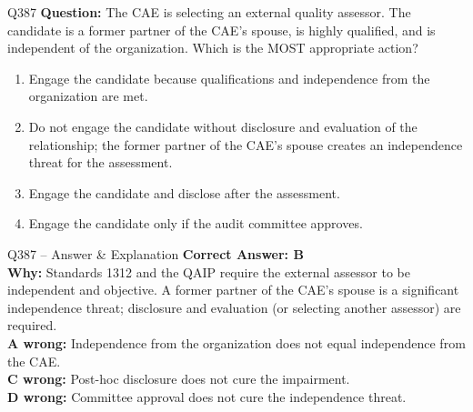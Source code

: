 \documentclass[aspectratio=169,10pt]{beamer}
\begin{document}
	\begin{frame}[t]{Q387}
		\small
		\textbf{Question:} The CAE is selecting an external quality assessor. The candidate is a former partner of the CAE's spouse, is highly qualified, and is independent of the organization. Which is the MOST appropriate action?
		\begin{enumerate}[label=\Alph*.,itemsep=1pt,topsep=2pt]
			\item Engage the candidate because qualifications and independence from the organization are met.
			\item Do not engage the candidate without disclosure and evaluation of the relationship; the former partner of the CAE's spouse creates an independence threat for the assessment.
			\item Engage the candidate and disclose after the assessment.
			\item Engage the candidate only if the audit committee approves.
		\end{enumerate}
	\end{frame}
	
	\begin{frame}[t]{Q387 -- Answer \& Explanation}
		\small
		\textbf{Correct Answer: B} \\[4pt]
		\textbf{Why:} Standards 1312 and the QAIP require the external assessor to be independent and objective. A former partner of the CAE's spouse is a significant independence threat; disclosure and evaluation (or selecting another assessor) are required. \\[4pt]
		\textbf{A wrong:} Independence from the organization does not equal independence from the CAE. \\[2pt]
		\textbf{C wrong:} Post-hoc disclosure does not cure the impairment. \\[2pt]
		\textbf{D wrong:} Committee approval does not cure the independence threat.
	\end{frame}
	
\end{document}
